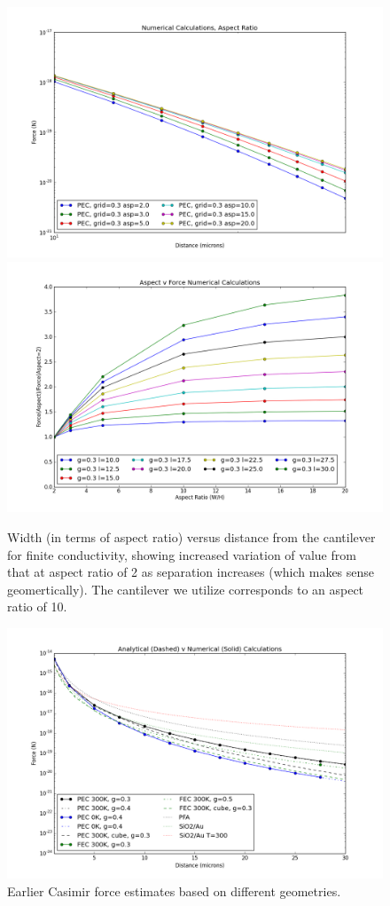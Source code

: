 \documentclass[11pt]{article}
\begin{document}
\begin{figure}[h]
\centering
\includegraphics[width=5in]{force_v_aspect_finite}
\includegraphics[width=5in]{aspect_correction_finite}
\caption{Width (in terms of aspect ratio) versus distance from the cantilever for finite conductivity, showing increased variation of value from that at aspect ratio of 2 as separation increases (which makes sense geomertically). The cantilever we utilize corresponds to an aspect ratio of 10.}\label{fig:aspectFinite}
\end{figure}

\begin{figure}[h]
\centering
\includegraphics[width=7in]{analytic_v_numerical_best}
\caption{Earlier Casimir force estimates based on different geometries.}\label{fig:earlyEstimate}
\end{figure}
\end{document}
